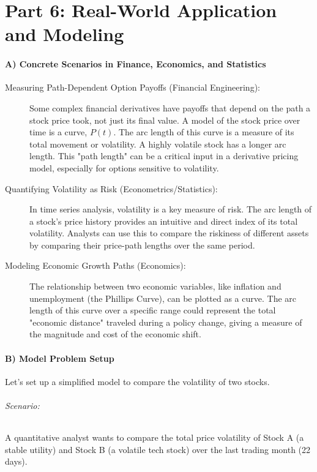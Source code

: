 \documentclass{article}
\begin{document}
\part*{Part 6: Real-World Application and Modeling}
\subsection*{A) Concrete Scenarios in Finance, Economics, and Statistics}
\begin{description}
    \item[Measuring Path-Dependent Option Payoffs (Financial Engineering):] Some complex financial derivatives have payoffs that depend on the path a stock price took, not just its final value. A model of the stock price over time is a curve, $P(t)$. The arc length of this curve is a measure of its total movement or volatility. A highly volatile stock has a longer arc length. This "path length" can be a critical input in a derivative pricing model, especially for options sensitive to volatility.
    \item[Quantifying Volatility as Risk (Econometrics/Statistics):] In time series analysis, volatility is a key measure of risk. The arc length of a stock's price history provides an intuitive and direct index of its total volatility. Analysts can use this to compare the riskiness of different assets by comparing their price-path lengths over the same period.
    \item[Modeling Economic Growth Paths (Economics):] The relationship between two economic variables, like inflation and unemployment (the Phillips Curve), can be plotted as a curve. The arc length of this curve over a specific range could represent the total "economic distance" traveled during a policy change, giving a measure of the magnitude and cost of the economic shift.
\end{description}

\subsection*{B) Model Problem Setup}
Let's set up a simplified model to compare the volatility of two stocks.
\paragraph{Scenario:} A quantitative analyst wants to compare the total price volatility of Stock A (a stable utility) and Stock B (a volatile tech stock) over the last trading month (22 days).
\end{document}
